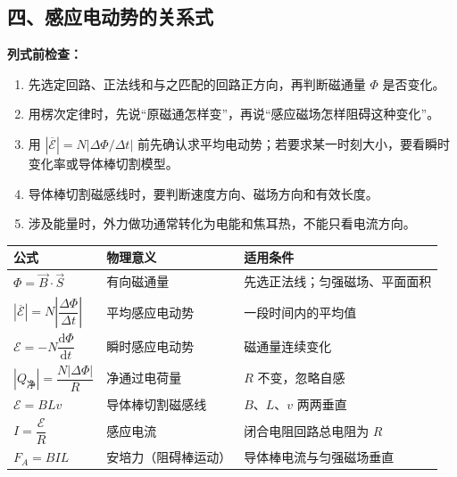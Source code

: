 \begin{samepage}
\section*{四、感应电动势的关系式}

\textbf{列式前检查：}
\nopagebreak[4]
\begin{enumerate}
  \item 先选定回路、正法线和与之匹配的回路正方向，再判断磁通量 $\Phi$ 是否变化。
  \item 用楞次定律时，先说“原磁通怎样变”，再说“感应磁场怎样阻碍这种变化”。
  \item 用 $\left|\overline{\mathcal E}\right|=N|\Delta\Phi/\Delta t|$ 前先确认求平均电动势；若要求某一时刻大小，要看瞬时变化率或导体棒切割模型。
  \item 导体棒切割磁感线时，要判断速度方向、磁场方向和有效长度。
  \item 涉及能量时，外力做功通常转化为电能和焦耳热，不能只看电流方向。
\end{enumerate}
\end{samepage}

\begin{center}
\begin{tabular}{lll}
\toprule
公式 & 物理意义 & 适用条件 \\
\midrule
$\Phi=\vec B\cdot\vec S$ & 有向磁通量 & 先选正法线；匀强磁场、平面面积 \\
$\left|\overline{\mathcal E}\right|=N\left|\dfrac{\Delta\Phi}{\Delta t}\right|$ & 平均感应电动势 & 一段时间内的平均值 \\
$\mathcal E=-N\dfrac{\mathrm d\Phi}{\mathrm dt}$ & 瞬时感应电动势 & 磁通量连续变化 \\
$|Q_{\text{净}}|=\dfrac{N|\Delta\Phi|}{R}$ & 净通过电荷量 & $R$ 不变，忽略自感 \\
$\mathcal E=BLv$ & 导体棒切割磁感线 & $B$、$L$、$v$ 两两垂直 \\
$I=\dfrac{\mathcal E}{R}$ & 感应电流 & 闭合电阻回路总电阻为 $R$ \\
$F_A=BIL$ & 安培力（阻碍棒运动） & 导体棒电流与匀强磁场垂直 \\
\bottomrule
\end{tabular}
\end{center}

